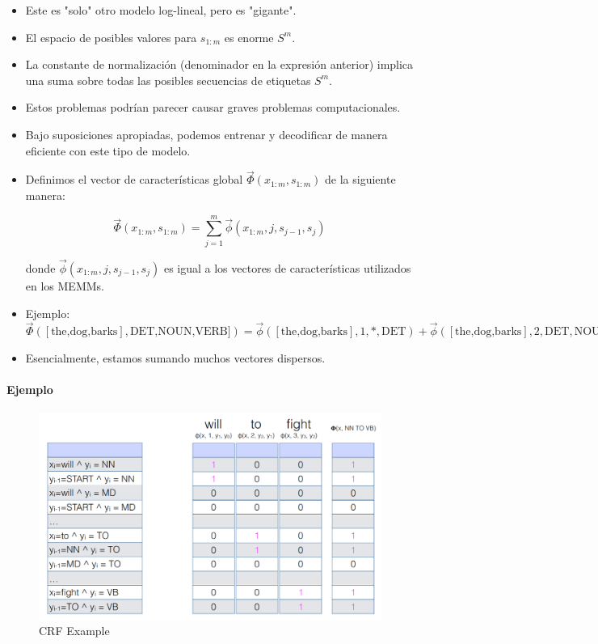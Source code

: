 \begin{itemize}
\item Este es "solo" otro modelo log-lineal, pero es "gigante".
\item El espacio de posibles valores para $s_{1:m}$ es enorme $S^m$.
\item La constante de normalización (denominador en la expresión anterior) implica una suma sobre todas las posibles secuencias de etiquetas $S^m$.
\item Estos problemas podrían parecer causar graves problemas computacionales.
\item Bajo suposiciones apropiadas, podemos entrenar y decodificar de manera eficiente con este tipo de modelo.
\item Definimos el vector de características global $\vec{\Phi}(x_{1:m},s_{1:m})$ de la siguiente manera:

\begin{displaymath}
\vec{\Phi}(x_{1:m},s_{1:m}) = \sum_{j=1}^{m} \vec{\phi}(x_{1:m},j,s_{j-1},s_j)
\end{displaymath}

donde $\vec{\phi}(x_{1:m},j,s_{j-1},s_j)$ es igual a los vectores de características utilizados en los MEMMs.

\item Ejemplo: $\vec{\Phi}([\text{the,dog,barks}],\text{DET,NOUN,VERB}]) = \vec{\phi}([\text{the,dog,barks}],1,*,\text{DET}) + \vec{\phi}([\text{the,dog,barks}],2,\text{DET},\text{NOUN}) + \vec{\phi}([\text{the,dog,barks}],3,\text{NOUN},\text{VERB})$

\item Esencialmente, estamos sumando muchos vectores dispersos.

\end{itemize}


\paragraph{Ejemplo}
\begin{figure}[h]
\centering
\includegraphics[scale=0.26]{pics/CRF3.png}
\caption{CRF Example}
\end{figure}


